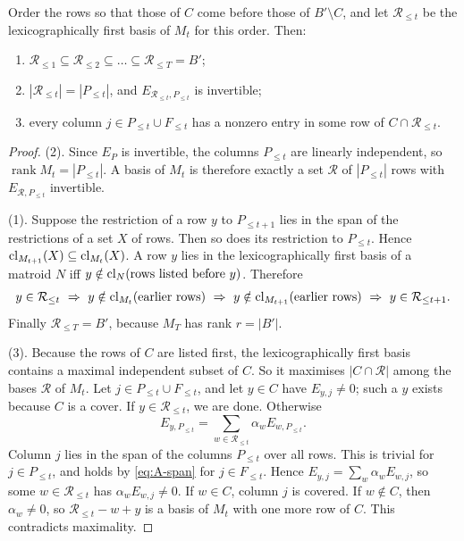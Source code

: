 \begin{lemma}\label{lem:SC}\label{lem:sc}
Order the rows so that those of $C$ come before those of $B'\setminus C$, and let $\mathcal R_{\le t}$ be the
lexicographically first basis of $M_t$ for this order. Then:
\begin{enumerate}[label=(\arabic*)]
\item $\mathcal R_{\le1}\subseteq\mathcal R_{\le2}\subseteq\dots\subseteq\mathcal R_{\le T}=B'$;
\item $|\mathcal R_{\le t}|=|P_{\le t}|$, and $E_{\mathcal R_{\le t},P_{\le t}}$ is invertible;
\item every column $j\in P_{\le t}\cup F_{\le t}$ has a nonzero entry in some row of $C\cap\mathcal R_{\le t}$.
\end{enumerate}
\end{lemma}

\begin{proof}
(2). Since $E_P$ is invertible, the columns $P_{\le t}$ are linearly independent, so $\operatorname{rank}M_t=|P_{\le t}|$.
A basis of $M_t$ is therefore exactly a set $\mathcal R$ of $|P_{\le t}|$ rows with $E_{\mathcal R,P_{\le t}}$
invertible.

(1). Suppose the restriction of a row $y$ to $P_{\le t+1}$ lies in the span of the restrictions of a set $X$ of rows.
Then so does its restriction to $P_{\le t}$. Hence $\mathrm{cl}_{M_{t+1}}(X)\subseteq\mathrm{cl}_{M_t}(X)$. A row $y$ lies in the
lexicographically first basis of a matroid $N$ iff $y\notin\mathrm{cl}_N(\text{rows listed before }y)$. Therefore
\[
  y\in\mathcal R_{\le t}\ \Rightarrow\ y\notin\mathrm{cl}_{M_t}(\text{earlier rows})\ \Rightarrow\
  y\notin\mathrm{cl}_{M_{t+1}}(\text{earlier rows})\ \Rightarrow\ y\in\mathcal R_{\le t+1}.
\]
Finally $\mathcal R_{\le T}=B'$, because $M_T$ has rank $r=|B'|$.

(3). Because the rows of $C$ are listed first, the lexicographically first basis contains a maximal independent subset of
$C$. So it maximises $|C\cap\mathcal R|$ among the bases $\mathcal R$ of $M_t$. Let $j\in P_{\le t}\cup F_{\le t}$, and
let $y\in C$ have $E_{y,j}\ne0$; such a $y$ exists because $C$ is a cover. If $y\in\mathcal R_{\le t}$, we are done.
Otherwise
\[
  E_{y,P_{\le t}}=\sum_{w\in\mathcal R_{\le t}}\alpha_wE_{w,P_{\le t}} .
\]
Column $j$ lies in the span of the columns $P_{\le t}$ over all rows. This is trivial for $j\in P_{\le t}$, and holds by
\eqref{eq:A-span} for $j\in F_{\le t}$. Hence $E_{y,j}=\sum_w\alpha_wE_{w,j}$, so some $w\in\mathcal R_{\le t}$ has
$\alpha_wE_{w,j}\ne0$. If $w\in C$, column $j$ is covered. If $w\notin C$, then $\alpha_w\ne0$, so
$\mathcal R_{\le t}-w+y$ is a basis of $M_t$ with one more row of $C$. This contradicts maximality.
\end{proof}

